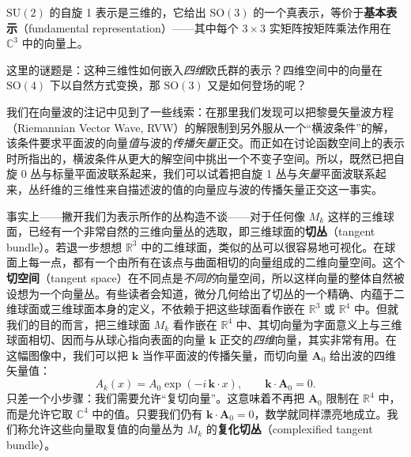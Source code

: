 $\mathrm{SU}(2)$ 的自旋 1 表示是三维的，它给出 $\mathrm{SO}(3)$ 的一个真表示，等价于\textbf{基本表示}（fundamental representation）——其中每个 $3\times3$ 实矩阵按矩阵乘法作用在 $\mathbb{C}^3$ 中的向量上。

这里的谜题是：这种三维性如何嵌入\emph{四维}欧氏群的表示？四维空间中的向量在 $\mathrm{SO}(4)$ 下以自然方式变换，那 $\mathrm{SO}(3)$ 又是如何登场的呢？

我们在向量波的注记中见到了一些线索：在那里我们发现可以把黎曼矢量波方程（Riemannian Vector Wave, RVW）的解限制到另外服从一个“横波条件”的解，该条件要求平面波的向量\emph{值}与波的\emph{传播矢量}正交。而正如在讨论函数空间上的表示时所指出的，横波条件从更大的解空间中挑出一个不变子空间。所以，既然已把自旋 0 丛与标量平面波联系起来，我们可以试着把自旋 1 丛与\emph{矢量}平面波联系起来，丛纤维的三维性来自描述波的值的向量应与波的传播矢量正交这一事实。


事实上——撇开我们为表示所作的丛构造不谈——对于任何像 $M_k$ 这样的三维球面，已经有一个非常自然的三维向量丛的选取，即三维球面的\textbf{切丛}（tangent bundle）。若退一步想想 $\mathbb{R}^3$ 中的二维球面，类似的丛可以很容易地可视化。在球面上每一点，都有一个由所有在该点与曲面相切的向量组成的二维向量空间。这个\textbf{切空间}（tangent space）在不同点是\emph{不同的}向量空间，所以这样向量的整体自然被设想为一个向量丛。有些读者会知道，微分几何给出了切丛的一个精确、内蕴于二维球面或三维球面本身的定义，不依赖于把这些球面看作嵌在 $\mathbb{R}^3$ 或 $\mathbb{R}^4$ 中。但就我们的目的而言，把三维球面 $M_k$ 看作嵌在 $\mathbb{R}^4$ 中、其切向量为字面意义上与三维球面相切、因而与从球心指向表面的向量 $\mathbf{k}$ 正交的\emph{四维}向量，其实非常有用。在这幅图像中，我们可以把 $\mathbf{k}$ 当作平面波的传播矢量，而切向量 $\mathbf{A}_0$ 给出波的四维矢量值：
\[
A_k(x)=A_0\exp(-i\,\mathbf{k}\cdot x),\qquad \mathbf{k}\cdot\mathbf{A}_0=0 .
\]
只差一个小步骤：我们需要允许“复切向量”。这意味着不再把 $\mathbf{A}_0$ 限制在 $\mathbb{R}^4$ 中，而是允许它取 $\mathbb{C}^4$ 中的值。只要我们仍有 $\mathbf{k}\cdot\mathbf{A}_0=0$，数学就同样漂亮地成立。我们称允许这些向量取复值的向量丛为 $M_k$ 的\textbf{复化切丛}（complexified tangent bundle）。

